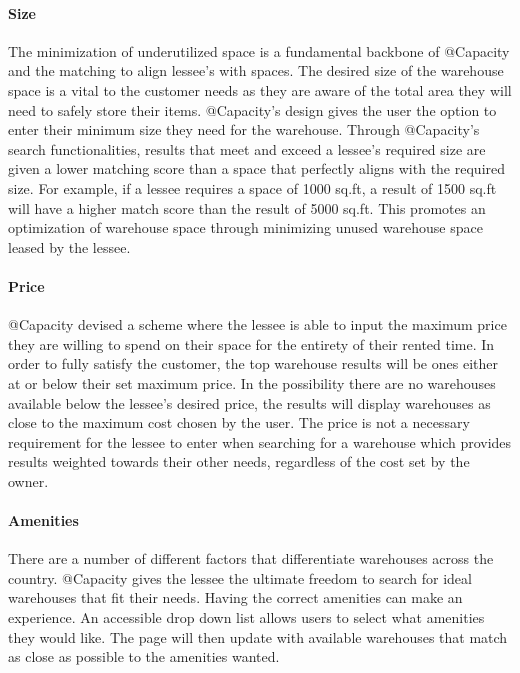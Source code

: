 \paragraph{Size}
The minimization of underutilized space is a fundamental backbone of @Capacity and the matching to align lessee's with spaces.  The desired size of the warehouse space is a vital to the customer needs as they are aware of the total area they will need to safely store their items. @Capacity's design gives the user the option to enter their minimum size they need for the warehouse. Through @Capacity's search functionalities, results that meet and exceed a lessee's required size are given a lower matching score than a space that perfectly aligns with the required size.  For example, if a lessee requires a space of 1000 sq.ft, a result of 1500 sq.ft will have a higher match score than the result of 5000 sq.ft.  This promotes an optimization of warehouse space through minimizing unused warehouse space leased by the lessee.

\paragraph{Price}
@Capacity devised a scheme where the lessee is able to input the maximum price they are willing to spend on their space for the entirety of their rented time. In order to fully satisfy the customer, the top warehouse results will be ones either at or below their set maximum price. In the possibility there are no warehouses available below the lessee's desired price, the results will display warehouses as close to the maximum cost chosen by the user. The price is not a necessary requirement for the lessee to enter when searching for a warehouse which provides results weighted towards their other needs, regardless of the cost set by the owner. 

\paragraph{Amenities}
There are a number of different factors that differentiate warehouses across the country. @Capacity gives the lessee the ultimate freedom to search for ideal warehouses that fit their needs. Having the correct amenities can make an experience. An accessible drop down list allows users to select what amenities they would like. The page will then update with available warehouses that match as close as possible to the amenities wanted. 


